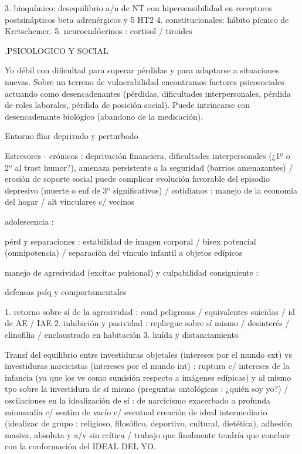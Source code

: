 \documentclass{scrbook}
\begin{document}
3. bioquímico: desequilibrio a/n de NT con hipersensibilidad en receptores postsinápticos beta adrenérgicos y 5 HT2
4. constitucionales: hábito pícnico de Kretschemer.
5. neuroendócrinos : cortisol / tiroides

.PSICOLOGICO Y SOCIAL

Yo débil con dificultad para superar pérdidas y para adaptarse a situaciones nuevas. Sobre un terreno de vulnerabilidad encontramos factores psicosociales actuando como desencadenantes (pérdidas, dificultades interpersonales, pérdida de roles laborales, pérdida de posición social). Puede intrincarse con desencadenante biológico (abandono de la medicación).

Entorno fliar deprivado y perturbado

Estresores - crónicos : deprivación financiera, dificultades interpersonales (¿1º o 2º al trast humor?), amenaza persistente a la seguridad (barrios amenazantes) / erosión de soporte social puede complicar evolución favorable del episodio depresivo (muerte o enf de 3º significativos) / cotidianos : manejo de la economía del hogar / alt vinculares c/ vecinos

adolescencia :

pérd y separaciones : estabilidad de imagen corporal / bisex potencial (omnipotencia) / separación del vínculo infantil a objetos edípicos

manejo de agresividad (excitac pulsional) y culpabilidad consiguiente :

defensas psíq y comportamentales

1. retorno sobre sí de la agresividad : cond peligrosas / equivalentes suicidas / id de AE / IAE
2. inhibición y pasividad : repliegue sobre sí mismo / desinterés / clinofilia / enclaustrado en habitación
3. huída y distanciamiento

Transf del equilibrio entre investiduras objetales (intereses por el mundo ext) vs investiduras narcicistas (intereses por el mundo int) : ruptura c/ intereses de la infancia (ya que los ve como sumisión respecto a imágenes edípicas) y al mismo tpo sobre la investidura de sí mismo (preguntas ontológicas : ¿quién soy yo?) / oscilaciones en la idealización de sí : de narcicismo exacerbado a profunda minusvalía c/ sentim de vacío c/ eventual creación de ideal intermediario (idealizac de grupo : religioso, filosófico, deportivo, cultural, dietética), adhesión masiva, absoluta y a/v sin crítica / trabajo que finalmente tendría que concluir con la conformación del IDEAL DEL YO.
\end{document}
